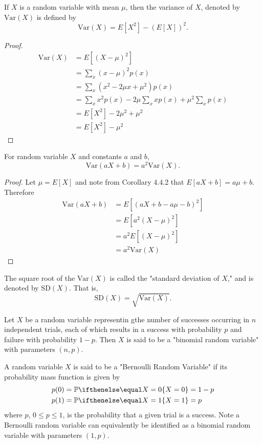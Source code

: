 \documentclass[a4paper,8pt]{article}
\begin{document}
\begin{outline}
    If \(X\) is a random variable with mean \(\mu\), then the variance of \(X\), denoted by \(\text{Var}(X)\)
    is defined by \[\text{Var}(X) = E[X^2]-(E[X])^2\text{.} \]

    \pagebreak
    \begin{proof}
      \begin{align*}
        \text{Var}(X) &= E[(X-\mu)^2] \\
                      &= \sum_x(x-\mu)^2p(x) \\
                      &= \sum_x(x^2-2\mu x+\mu^2)p(x) \\
                      &= \sum_x x^2p(x) - 2\mu\sum_x xp(x) + \mu^2\sum_x p(x) \\
                      &= E[X^2] - 2\mu^2 + \mu^2 \\
                      &= E[X^2] - \mu^2
      \end{align*}
    \end{proof}

    For random variable \(X\) and constants \(a\) and \(b\),
    \[ \text{Var}(aX+b) = a^2\text{Var}(X)\text{.} \]

    \begin{proof}
      Let \(\mu = E[X]\) and note from Corollary 4.4.2 that \(E[aX+b] = a\mu+b\).
      Therefore
      \begin{align*}
        \text{Var}(aX+b) &= E[(aX+b-a\mu-b)^2] \\
                         &= E[a^2(X-\mu)^2] \\
                         &= a^2E[(X-\mu)^2] \\
                         &= a^2\text{Var}(X)
      \end{align*}
    \end{proof}

    The square root of the \(\text{Var}(X)\) is called the "standard deviation of \(X\)," and is denoted by
    \(\text{SD}(X)\). That is, \[\text{SD}(X) = \sqrt{\text{Var}(X)}\text{.}\]

    Let \(X\) be a random variable representin gthe number of successes occurring in \(n\) independent trials,
    each of which results in a success with probability \(p\) and failure with probability \(1-p\). Then
    \(X\) is said to be a "binomial random variable" with parameters \((n, p)\).

    A random variable \(X\) is said to be a "Bernoulli Random Variable" if its probability mass function is given by
    \begin{align*}
      p(0) &= \bbp[X=0] = 1 - p \\
      p(1) &= \bbp[X=1] = p
    \end{align*}
    where \(p\), \(0 \leq p \leq 1\), is the probability that a given trial is a success. Note a Bernoulli random
    variable can equivalently be identified as a binomial random variable with parameters \((1, p)\).


\end{outline}
\end{document}
